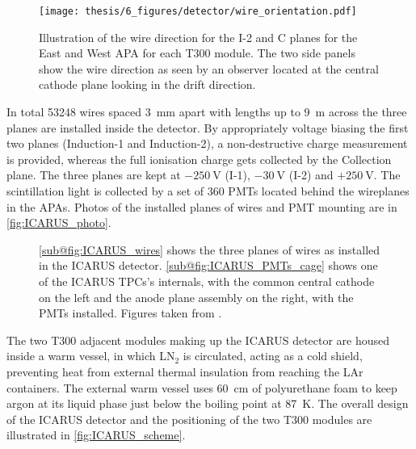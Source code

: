 \begin{figure}
    \centering
    \texttt{[image: thesis/6\_figures/detector/wire\_orientation.pdf]}
    \caption[T300 module Induction-2 and collection planes wire orientation]{Illustration of the wire direction for the I-2 and C planes for the East and West APA for each T300 module. The two side panels show the wire direction as seen by an observer located at the central cathode plane looking in the drift direction. }
    \label{fig:i2_c_planes_wirepitch_detail}
\end{figure}

In total \num{53248} wires spaced \SI{3}{\mm} apart with lengths up to \SI{9}{\m} across the three planes are installed inside the detector. By appropriately voltage biasing the first two planes (Induction-1 and Induction-2), a non-destructive charge measurement is provided, whereas the full ionisation charge gets collected by the Collection plane. The three planes are kept at $-\SI{250}{\volt}$ (I-1), $-\SI{30}{\volt}$ (I-2) and $+\SI{250}{\volt}$. The scintillation light is collected by a set of \num{360} PMTs located behind the wireplanes in the APAs. Photos of the installed planes of wires and PMT mounting are in \autoref{fig:ICARUS_photo}. 

\begin{figure}
    \centering
    \hspace{1em}
    \caption[ICARUS TPC wires and field cage]{\ref{sub@fig:ICARUS_wires} shows the three planes of wires as installed in the ICARUS detector. \ref{sub@fig:ICARUS_PMTs_cage} shows one of the ICARUS TPCs's internals, with the common central cathode on the left and the anode plane assembly on the right, with the PMTs installed. Figures taken from \cite{amerioDesignConstructionTests2004c,abratenkoICARUSFermilabShortBaseline2023}. }
    \label{fig:ICARUS_photo} 
\end{figure}

The two T300 adjacent modules making up the ICARUS detector are housed inside a warm vessel, in which LN$_2$ is circulated, acting as a cold shield, preventing heat from external thermal insulation from reaching the LAr containers. The external warm vessel uses \SI{60}{\cm} of polyurethane foam to keep argon at its liquid phase just below the boiling point at \SI{87}{\kelvin}. The overall design of the ICARUS detector and the positioning of the two T300 modules are illustrated in \autoref{fig:ICARUS_scheme}. 

